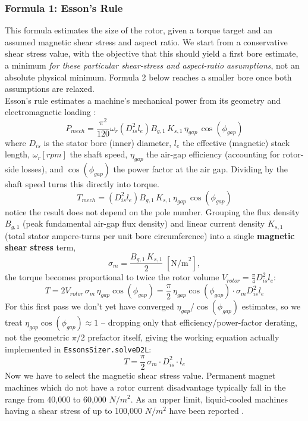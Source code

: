 \documentclass[11pt,a4paper]{article}
\begin{document}
\subsubsection*{Formula 1: Esson's Rule}
This formula estimates the size of the rotor, given a torque target and an assumed magnetic shear stress and aspect ratio. We start from a conservative shear stress value, with the objective that this should yield a first bore estimate, a minimum \emph{for these particular shear-stress and aspect-ratio assumptions}, not an absolute physical minimum. Formula 2 below reaches a smaller bore once both assumptions are relaxed.
\\Esson's rule estimates a machine's mechanical power from its geometry and electromagnetic loading \cite{LucaLecture6}:
$$P_{mech} = \frac{\pi^2}{120}\omega_r\left(D_{is}^2l_e\right)B_{g,1}\,K_{s,1}\,\eta_{gap}\,\cos(\phi_{gap})$$
where $D_{is}$ is the stator bore (inner) diameter, $l_e$ the effective (magnetic) stack length, $\omega_r[rpm]$ the shaft speed, $\eta_{gap}$ the air-gap efficiency (accounting for rotor-side losses), and $\cos(\phi_{gap})$ the power factor at the air gap. Dividing by the shaft speed turns this directly into torque.
$$T_{mech} = \left(D_{is}^2l_e\right)B_{g,1}\,K_{s,1}\,\eta_{gap}\,\cos(\phi_{gap})$$
notice the result does not depend on the pole number. Grouping the flux density $B_{g,1}$ (peak fundamental air-gap flux density) and linear current density $K_{s,1}$ (total stator ampere-turns per unit bore circumference) into a single \textbf{magnetic shear stress} term,
$$\sigma_m = \frac{B_{g,1}\,K_{s,1}}{2}\;[\text{N/m}^2],$$
the torque becomes proportional to twice the rotor volume $V_{rotor}=\frac{\pi}{4}D_{is}^2l_e$:
$$T = 2V_{rotor}\,\sigma_m\,\eta_{gap}\cos(\phi_{gap}) = \frac{\pi}{2}\,\eta_{gap}\cos(\phi_{gap})\cdot\sigma_m D_{is}^2 l_e$$
For this first pass we don't yet have converged $\eta_{gap}$/$\cos(\phi_{gap})$ estimates, so we treat $\eta_{gap}\cos(\phi_{gap})\approx 1$ -- dropping only that efficiency/power-factor derating, not the geometric $\pi/2$ prefactor itself, giving the working equation actually implemented in \texttt{EssonsSizer.solveD2L}:
\begin{equation}
\label{eq:essons_rule}
T = \frac{\pi}{2}\,\sigma_m \cdot D_{is}^2 \cdot l_e
\end{equation}
Now we have to select the magnetic shear stress value. Permanent magnet machines which do not have a rotor current disadvantage typically fall in the range from 40,000 to 60,000 $N/m^2$. As an upper limit, liquid-cooled machines having a shear stress of up to 100,000 $N/m^2$ have been reported \cite{Lipo2017}.
\end{document}
